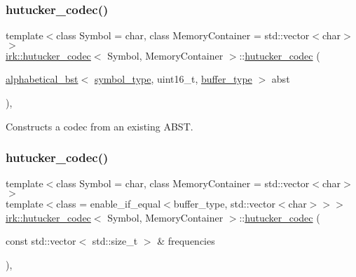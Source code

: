\mbox{\label{classirk_1_1hutucker__codec_a07f7f1c0f6fa0162dcafe5848fdfbb73}} 
\subsubsection{\texorpdfstring{hutucker\+\_\+codec()}{hutucker\_codec()}\hspace{0.1cm}{\footnotesize\ttfamily [3/4]}}
{\footnotesize\ttfamily template$<$class Symbol = char, class Memory\+Container = std\+::vector$<$char$>$$>$ \\
\mbox{\hyperlink{classirk_1_1hutucker__codec}{irk\+::hutucker\+\_\+codec}}$<$ Symbol, Memory\+Container $>$\+::\mbox{\hyperlink{classirk_1_1hutucker__codec}{hutucker\+\_\+codec}} (\begin{DoxyParamCaption}\item[{\mbox{\hyperlink{classirk_1_1alphabetical__bst}{alphabetical\+\_\+bst}}$<$ \mbox{\hyperlink{classirk_1_1hutucker__codec_af23dee5959ae2a69eea0ab324cf6ecb6}{symbol\+\_\+type}}, uint16\+\_\+t, \mbox{\hyperlink{classirk_1_1hutucker__codec_a995378c8c253dae9867a4b1762eeaf95}{buffer\+\_\+type}} $>$}]{abst }\end{DoxyParamCaption})\hspace{0.3cm}{\ttfamily [inline]}, {\ttfamily [explicit]}}



Constructs a codec from an existing A\+B\+ST. 

\mbox{\label{classirk_1_1hutucker__codec_a41e575e3badde26ab126e10f15ce8315}} 
\subsubsection{\texorpdfstring{hutucker\+\_\+codec()}{hutucker\_codec()}\hspace{0.1cm}{\footnotesize\ttfamily [4/4]}}
{\footnotesize\ttfamily template$<$class Symbol = char, class Memory\+Container = std\+::vector$<$char$>$$>$ \\
template$<$class  = enable\+\_\+if\+\_\+equal$<$buffer\+\_\+type, std\+::vector$<$char$>$$>$$>$ \\
\mbox{\hyperlink{classirk_1_1hutucker__codec}{irk\+::hutucker\+\_\+codec}}$<$ Symbol, Memory\+Container $>$\+::\mbox{\hyperlink{classirk_1_1hutucker__codec}{hutucker\+\_\+codec}} (\begin{DoxyParamCaption}\item[{const std\+::vector$<$ std\+::size\+\_\+t $>$ \&}]{frequencies }\end{DoxyParamCaption})\hspace{0.3cm}{\ttfamily [inline]}, {\ttfamily [explicit]}}



